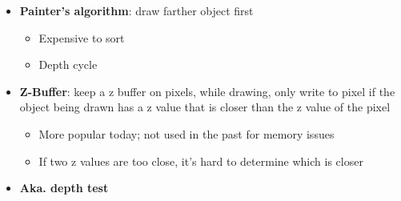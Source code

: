   \begin{itemize}
    \item \textbf{Painter's algorithm}: draw farther object first
    \begin{itemize}
      \item Expensive to sort
      \item Depth cycle
    \end{itemize}

    \item \textbf{Z-Buffer}: keep a z buffer on pixels, while drawing,
    only write to pixel if the object being drawn has a z value that is
    closer than the z value of the pixel
    \begin{itemize}
      \item More popular today; not used in the past for memory issues
      \item If two z values are too close, it's hard to determine which is
      closer
    \end{itemize}

    \item \textbf{Aka. depth test}
  \end{itemize}
